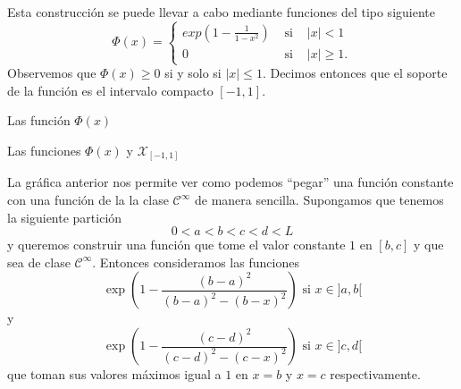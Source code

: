 \documentclass[10pt,handout]{beamer}
\theoremstyle{plain} %
\theoremstyle{plain} %
\theoremstyle{plain} %
\theoremstyle{plain} %
\theoremstyle{definition}
\theoremstyle{example}
\theoremstyle{example}
\theoremstyle{remark}
\theoremstyle{remark}
\begin{document}
\begin{frame}
Esta construcción se puede llevar a cabo mediante funciones del tipo siguiente
$$
\Phi(x)= \left\{
\begin{array}{ccc}
exp\left( 1- \frac{1}{1-x^2} \right) & \text{ si } & |x| < 1 \\ 
0 & \text{ si } & |x| \ge 1.
\end{array}
\right.
$$
Observemos que $\Phi(x) \ge 0$ si y solo si $|x| \le 1.$ Decimos entonces que el soporte de la función 
es el intervalo compacto $[-1,1].$
\end{frame}


\begin{frame}{Las función $\Phi(x)$}
\end{frame}

\begin{frame}{Las funciones $\Phi(x)$ y $\mathcal{X}_{[-1,1]}$}
\end{frame}

\begin{frame}
La gráfica anterior nos permite ver como podemos ``pegar'' una función constante con una
función de la la clase $\mathcal{C}^{\infty}$ de manera sencilla.
Supongamos que tenemos la siguiente partición
$$
0 < a < b < c < d < L
$$ 
y queremos construir una función que tome el valor constante $1$ en $[b,c]$ y que sea de
clase $\mathcal{C}^{\infty}.$ Entonces consideramos las funciones
$$
\exp\left(1- \frac{(b-a)^2}{(b-a)^2-(b-x)^2}\right) \text{ si } x \in ]a,b[
$$
y
$$
\exp\left(1- \frac{(c-d)^2}{(c-d)^2-(c-x)^2}\right) \text{ si } x \in ]c,d[
$$
que toman sus valores máximos igual a $1$ en $x=b$ y $x=c$ respectivamente. 
\end{frame}
\end{document}
